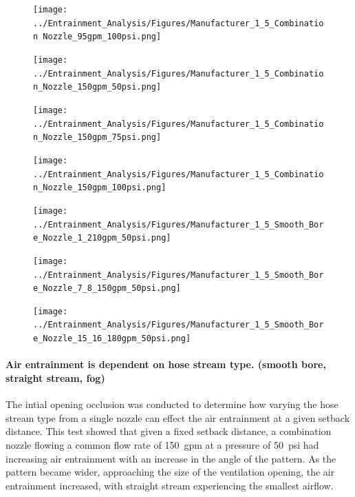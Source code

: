 \documentclass{article}
\begin{document}
\clearpage

\begin{figure}[!ht]
	\centering
	\texttt{[image: ../Entrainment\_Analysis/Figures/Manufacturer\_1\_5\_Combination Nozzle\_95gpm\_100psi.png]}
\end{figure}

\begin{figure}[!ht]
	\centering
	\texttt{[image: ../Entrainment\_Analysis/Figures/Manufacturer\_1\_5\_Combination\_Nozzle\_150gpm\_50psi.png]}
\end{figure}

\clearpage

\begin{figure}[!ht]
	\centering
	\texttt{[image: ../Entrainment\_Analysis/Figures/Manufacturer\_1\_5\_Combination\_Nozzle\_150gpm\_75psi.png]}
\end{figure}

\begin{figure}[!ht]
	\centering
	\texttt{[image: ../Entrainment\_Analysis/Figures/Manufacturer\_1\_5\_Combination\_Nozzle\_150gpm\_100psi.png]}
\end{figure}

\clearpage

\begin{figure}[!ht]
	\centering
	\texttt{[image: ../Entrainment\_Analysis/Figures/Manufacturer\_1\_5\_Smooth\_Bore\_Nozzle\_1\_210gpm\_50psi.png]}
\end{figure}

\begin{figure}[!ht]
	\centering
	\texttt{[image: ../Entrainment\_Analysis/Figures/Manufacturer\_1\_5\_Smooth\_Bore\_Nozzle\_7\_8\_150gpm\_50psi.png]}
\end{figure}

\clearpage

\begin{figure}[!ht]
	\centering
	\texttt{[image: ../Entrainment\_Analysis/Figures/Manufacturer\_1\_5\_Smooth\_Bore\_Nozzle\_15\_16\_180gpm\_50psi.png]}
\end{figure}

\clearpage

\paragraph{Air entrainment is dependent on hose stream type. (smooth bore, straight stream, fog)} \mbox{}

The intial opening occlusion was conducted to determine how varying the hose stream type from a single nozzle can effect the air entrainment at a given setback distance. This test showed that given a fixed setback distance, a combination nozzle flowing a common flow rate of 150~gpm at a pressure of 50~psi had increasing air entrainment with an increase in the angle of the pattern. As the pattern became wider, approaching the size of the ventilation opening, the air entrainment increased, with straight stream experiencing the smallest airflow. 
\end{document}
